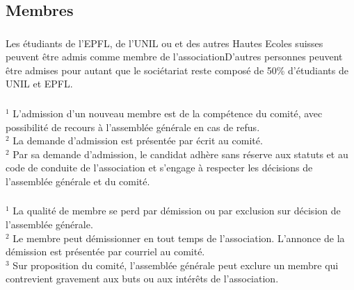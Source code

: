 \documentclass[12pt,a4paper,oneside]{article}
\newcounter{art}
\newcommand{\french}{    \switchcolumn[1]\noindent}
\newcounter{para}
\begin{document}
\begin{paracol}{2}
\french 
	\subsection{Membres}


\french



\french
	\subsubsection{}
Les étudiants de l’EPFL, de l’UNIL ou et des autres Hautes Ecoles suisses  peuvent être admis comme membre de l’associationD’autres personnes peuvent être admises pour autant que le sociétariat reste composé de 50\% d’étudiants de UNIL et EPFL.



\french
	\subsubsection{}
	$^1$ L’admission d’un nouveau membre est de la compétence du comité, avec possibilité de recours à l’assemblée générale en cas de refus.  \\
	$^2$ La demande d’admission est présentée par écrit au comité. \\
	$^2$ Par sa demande d’admission, le candidat adhère sans réserve aux statuts et au code de conduite de l’association et s’engage à respecter les décisions de l’assemblée générale et du comité.


\french
	\subsubsection{}

	$^1$ La qualité de membre se perd par démission ou par exclusion sur décision de l’assemblée générale. \\
	$^2$ Le membre peut démissionner en tout temps de l’association. L’annonce de la démission est présentée par courriel au comité. \\
	$^3$ Sur proposition du comité, l’assemblée générale peut exclure un membre qui contrevient gravement aux buts ou aux intérêts de l’association.


\end{paracol}
\end{document}
